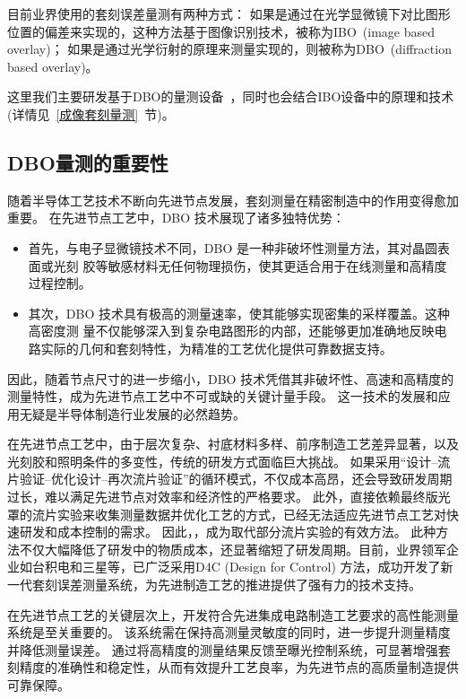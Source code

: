 目前业界使用的套刻误差量测有两种方式：
如果是通过在光学显微镜下对比图形位置的偏差来实现的，这种方法基于图像识别技术，被称为IBO~(image based overlay)；
如果是通过光学衍射的原理来测量实现的，则被称为DBO~(diffraction based overlay)。

这里我们主要研发基于DBO的量测设备~\cite{adel2008diffraction}，同时也会结合IBO设备中的原理和技术(详情见~\ref{成像套刻量测}~节)。

\subsection{DBO量测的重要性~\label{DBO量测的重要性}}
随着半导体工艺技术不断向先进节点发展，套刻测量在精密制造中的作用变得愈加重要。
在先进节点工艺中，DBO 技术展现了诸多独特优势：
\begin{itemize}[leftmargin=*] 
\setlength{\itemsep}{2pt}
\setlength{\parsep}{0pt}
\setlength{\parskip}{0pt}
\item 首先，与电子显微镜技术不同，DBO 是一种非破坏性测量方法，其对晶圆表面或光刻
胶等敏感材料无任何物理损伤，使其更适合用于在线测量和高精度过程控制。
\item 其次，DBO 技术具有极高的测量速率，使其能够实现密集的采样覆盖。这种高密度测
量不仅能够深入到复杂电路图形的内部，还能够更加准确地反映电路实际的几何和套刻特性，为精准的工艺优化提供可靠数据支持。
\end{itemize}

因此，随着节点尺寸的进一步缩小，DBO 技术凭借其非破坏性、高速和高精度的测量特性，成为先进节点工艺中不可或缺的关键计量手段。
这一技术的发展和应用无疑是半导体制造行业发展的必然趋势。

在先进节点工艺中，由于层次复杂、衬底材料多样、前序制造工艺差异显著，以及光刻胶和照明条件的多变性，传统的研发方式面临巨大挑战。
如果采用“设计–流片验证–优化设计–再次流片验证”的循环模式，不仅成本高昂，还会导致研发周期过长，难以满足先进节点对效率和经济性的严格要求。
此外，直接依赖最终版光罩的流片实验来收集测量数据并优化工艺的方式，已经无法适应先进节点工艺对快速研发和成本控制的需求。
因此，，成为取代部分流片实验的有效方法。
此种方法不仅大幅降低了研发中的物质成本，还显著缩短了研发周期。目前，业界领军企业如台积电和三星等，已广泛采用D4C (Design for Control) 方法，成功开发了新一代套刻误差测量系统，为先进制造工艺的推进提供了强有力的技术支持。

在先进节点工艺的关键层次上，开发符合先进集成电路制造工艺要求的高性能测量系统是至关重要的。
该系统需在保持高测量灵敏度的同时，进一步提升测量精度并降低测量误差。
通过将高精度的测量结果反馈至曝光控制系统，可显著增强套刻精度的准确性和稳定性，从而有效提升工艺良率，为先进节点的高质量制造提供可靠保障。

